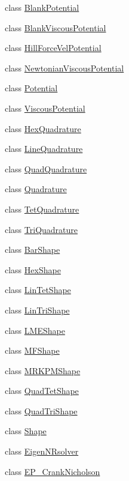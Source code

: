 \begin{DoxyCompactItemize}
\item 
class \hyperlink{classvoom_1_1_blank_potential}{BlankPotential}
\item 
class \hyperlink{classvoom_1_1_blank_viscous_potential}{BlankViscousPotential}
\item 
class \hyperlink{classvoom_1_1_hill_force_vel_potential}{HillForceVelPotential}
\item 
class \hyperlink{classvoom_1_1_newtonian_viscous_potential}{NewtonianViscousPotential}
\item 
class \hyperlink{classvoom_1_1_potential}{Potential}
\item 
class \hyperlink{classvoom_1_1_viscous_potential}{ViscousPotential}
\item 
class \hyperlink{classvoom_1_1_hex_quadrature}{HexQuadrature}
\item 
class \hyperlink{classvoom_1_1_line_quadrature}{LineQuadrature}
\item 
class \hyperlink{classvoom_1_1_quad_quadrature}{QuadQuadrature}
\item 
class \hyperlink{classvoom_1_1_quadrature}{Quadrature}
\item 
class \hyperlink{classvoom_1_1_tet_quadrature}{TetQuadrature}
\item 
class \hyperlink{classvoom_1_1_tri_quadrature}{TriQuadrature}
\item 
class \hyperlink{classvoom_1_1_bar_shape}{BarShape}
\item 
class \hyperlink{classvoom_1_1_hex_shape}{HexShape}
\item 
class \hyperlink{classvoom_1_1_lin_tet_shape}{LinTetShape}
\item 
class \hyperlink{classvoom_1_1_lin_tri_shape}{LinTriShape}
\item 
class \hyperlink{classvoom_1_1_l_m_e_shape}{LMEShape}
\item 
class \hyperlink{classvoom_1_1_m_f_shape}{MFShape}
\item 
class \hyperlink{classvoom_1_1_m_r_k_p_m_shape}{MRKPMShape}
\item 
class \hyperlink{classvoom_1_1_quad_tet_shape}{QuadTetShape}
\item 
class \hyperlink{classvoom_1_1_quad_tri_shape}{QuadTriShape}
\item 
class \hyperlink{classvoom_1_1_shape}{Shape}
\item 
class \hyperlink{classvoom_1_1_eigen_n_rsolver}{EigenNRsolver}
\item 
class \hyperlink{classvoom_1_1_e_p___crank_nicholson}{EP\_\-CrankNicholson}

\end{DoxyCompactItemize}
